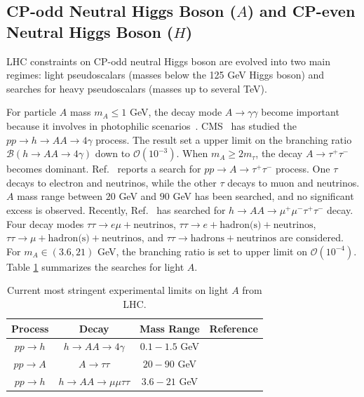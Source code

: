 \documentclass[a4paper,11pt]{article}
\begin{document}
\subsection{CP-odd Neutral Higgs Boson ($A$) and CP-even Neutral Higgs Boson ($H$)}

LHC constraints on CP-odd neutral Higgs boson are evolved into two main regimes: 
light pseudoscalars (masses below the 125 GeV Higgs boson) and 
searches for heavy pseudoscalars (masses up to several TeV). 

For particle $A$ mass $m_A\leq 1$ GeV, the decay mode $A\to \gamma\gamma$ become important 
because it involves in photophilic scenarios~\cite{Curtin:2013fra}. 
CMS~\cite{CMS:2022fyt,CMS:2026knm} has studied the $pp\to h\to AA\to 4\gamma$ process. 
The result set a upper limit on the branching ratio $\mathcal{B}(h\to AA\to 4\gamma)$ down to $\mathcal{O}(10^{-3})$. 
When $m_A\geq 2m_\tau$, the decay $A\to \tau^+\tau^-$ becomes dominant. 
Ref.~\cite{ATLAS:2024rzd} reports a search for $pp\to A\to\tau^+\tau^-$ process. 
One $\tau$ decays to electron and neutrinos, 
while the other $\tau$ decays to muon and neutrinos. 
$A$ mass range between $20$ GeV and $90$ GeV has been searched, 
and no significant excess is observed. 
Recently, Ref.~\cite{CMS:2026vim} has searched for $h\to AA\to \mu^+\mu^-\tau^+\tau^-$ decay. 
Four decay modes $\tau\tau\to e\mu+\text{neutrinos}$, $\tau\tau\to e+\text{hadron(s)}+\text{neutrinos}$, 
$\tau\tau\to \mu+\text{hadron(s)}+\text{neutrinos}$, 
and $\tau\tau\to \text{hadrons}+\text{neutrinos}$ are considered.
For $m_A\in(3.6, 21)$ GeV, the branching ratio is set to upper limit on $\mathcal{O}(10^{-4})$. 
Table \ref{table:cp-odd} summarizes the searches for light $A$.

\begin{table}
  \centering 
    \begin{tabular}{cccc}
    Process  & Decay & Mass Range & Reference \\
     \hline
    $pp\to h$ & $h\to AA\to 4\gamma$ & $0.1-1.5$ GeV & \cite{CMS:2022fyt} \\
    $pp\to A$  & $A\to\tau\tau$ &   
$20-90$ GeV       &     \cite{ATLAS:2024rzd}        \\%
$pp\to h$  & $h\to AA\to\mu\mu\tau\tau$ &   
$3.6-21$ GeV       &     \cite{CMS:2026vim}        \\%
    \hline
    \end{tabular}
      \caption{Current most stringent experimental limits on light $A$ from LHC.}
      \label{table:cp-odd}
  \end{table} 
\end{document}
